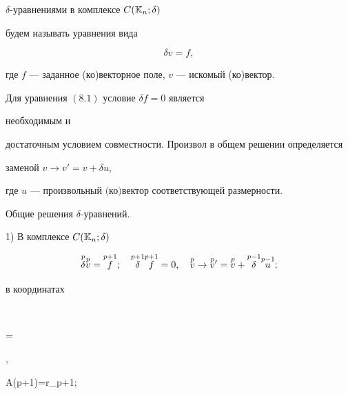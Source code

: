 \setcounter{defn}{1} 


 


\begin{defn} $\delta$-уравнениями в комплексе $C(\Bbb K_n;\delta)$ 


будем называть уравнения вида 


\begin{equation} 


\delta v=f, 


\end{equation} 


где $f$ --- заданное (ко)векторное поле, $v$ --- искомый (ко)вектор. 


\end{defn} 


 


\begin{prop} Для уравнения $(8.1)$ условие $\delta f=0$ является


необходимым и  


достаточным условием совместности. Произвол в общем решении определяется 


заменой $v\to v'=v+\delta u$, 


где $u$ --- произвольный $($ко$)$вектор соответствующей размерности. 


\end{prop} 


 


Общие решения $\delta$-уравнений. 


 


1) В комплексе $C(\Bbb K_n;\delta)$ 


$$ 


\up{p}{\delta}\up{p}{v}=\up{p+1}{f};\quad 


\up{p+1}{\delta}\up{p+1}{f}=0,\quad 


\up{p}{v}\to\up{p}{v}{}'=\up{p}{v}+\up{p-1}{\delta} 


\up{p-1}{u}; 


$$ 


в координатах 


$$ 




= 


,\quad 


\rang A(p+1)=r_{p+1}; 


